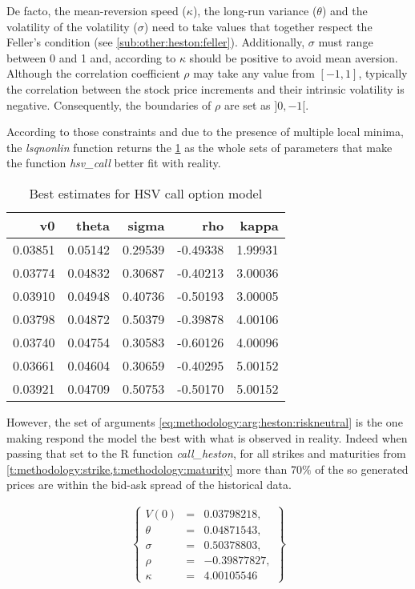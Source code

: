 \documentclass[a4paper, 12pt]{report}
\begin{document}
De facto, the mean-reversion speed ($\kappa$), the long-run variance ($\theta$) and the volatility of the volatility ($\sigma$) need to take values that together respect the Feller's condition (see \cref{sub:other:heston:feller}). 
Additionally, $\sigma$ must range between 0 and 1 and, according to \citet{cristo2015} $\kappa$ should be positive to avoid mean aversion.
Although the correlation coefficient $\rho$ may take any value from $[-1, 1]$, typically the correlation between the stock price increments and their intrinsic volatility is negative. Consequently, the boundaries of $\rho$ are set as $]0, -1[$.

According to those constraints and due to the presence of multiple local minima, the \textit{lsqnonlin} function returns the \cref{t:methodology:call:heston:estimate1} as the whole sets of parameters that make the function \textit{hsv\_call} better fit with reality.

\begin{table}[h]
\centering
\begin{tabular}{rrrrr}
  \hline
v0 & theta & sigma & rho & kappa \\ 
  \hline
  0.03851 & 0.05142 & 0.29539 & -0.49338 & 1.99931 \\ 
  0.03774 & 0.04832 & 0.30687 & -0.40213 & 3.00036 \\ 
  0.03910 & 0.04948 & 0.40736 & -0.50193 & 3.00005 \\ 
  0.03798 & 0.04872 & 0.50379 & -0.39878 & 4.00106 \\
  0.03740 & 0.04754 & 0.30583 & -0.60126 & 4.00096 \\ 
  0.03661 & 0.04604 & 0.30659 & -0.40295 & 5.00152 \\ 
  0.03921 & 0.04709 & 0.50753 & -0.50170 & 5.00152 \\ 
   \hline
\end{tabular}
\caption{Best estimates for HSV call option model} 
\label{t:methodology:call:heston:estimate1}
\end{table}

However, the set of arguments \ref{eq:methodology:arg:heston:riskneutral} is the one making respond the model the best with what is observed in reality.
Indeed when passing that set to the R function \textit{call\_heston}, for all strikes and maturities from \cref{t:methodology:strike,t:methodology:maturity}  more than $70\%$ of the so generated prices are within the bid-ask spread of the historical data.

\begin{align}
  \left \{
  \begin{array}{lcl}
    V(0) &= &0.03798218, \\
    \theta &= &0.04871543, \\
    \sigma &= &0.50378803, \\
    \rho &= &-0.39877827, \\
    \kappa &= &4.00105546 
  \end{array}
  \right \}  
  \label{eq:methodology:arg:heston:riskneutral}
\end{align}
\end{document}

